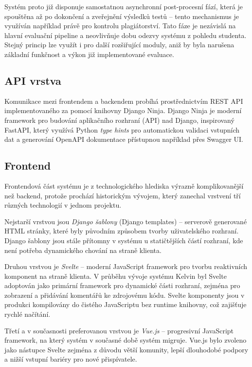 Systém proto již disponuje samostatnou asynchronní post-procesní fází, která je spouštěna až po dokončení a zveřejnění výsledků testů – tento mechanismus je využíván například právě pro kontrolu plagiátorství.
Tato fáze je nezávislá na hlavní evaluační pipeline a neovlivňuje dobu odezvy systému z pohledu studenta.
Stejný princip lze využít i pro další rozšiřující moduly, aniž by byla narušena základní funkčnost a výkon již implementované evaluace.

\subsection{API vrstva}
\label{subsec:kelvin-api}

Komunikace mezi frontendem a backendem probíhá prostřednictvím REST API implementovaného za pomocí knihovny Django Ninja.
Django Ninja je moderní framework pro budování aplikačního rozhraní (API) nad Django, inspirovaný FastAPI, který využívá Python \textit{type hints} pro automatickou validaci vstupních dat a generování OpenAPI dokumentace přístupnou například přes Swagger UI\@.

\subsection{Frontend}
\label{subsec:kelvin-frontend}

Frontendová část systému je z technologického hlediska výrazně komplikovanější než backend, protože prochází historickým vývojem, který zanechal vrstvení tří různých technologií v jednom projektu.

Nejstarší vrstvou jsou \textit{Django šablony} (Django templates) -- serverově generované HTML stránky, které byly původním způsobem tvorby uživatelského rozhraní.
Django šablony jsou stále přítomny v systému u statičtějších částí rozhraní, kde není potřeba dynamického chování na straně klienta.

Druhou vrstvou je \textit{Svelte} -- moderní JavaScript framework pro tvorbu reaktivních komponent na straně klienta.
V průběhu vývoje systému Kelvin byl Svelte adoptován jako primární framework pro dynamické části rozhraní, zejména pro zobrazení a přidávání komentářů ke zdrojovému kódu.
Svelte komponenty jsou v produkci kompilovány do čistého JavaScriptu bez runtime knihovny, což zajišťuje rychlé načítání.

Třetí a v současnosti preferovanou vrstvou je \textit{Vue.js} -- progresivní JavaScript framework, na který systém v současné době systém migruje.
Vue.js bylo zvoleno jako nástupce Svelte zejména z důvodu větší komunity, lepší dlouhodobé podpory a nižší vstupní bariéry pro nové přispívatele.

